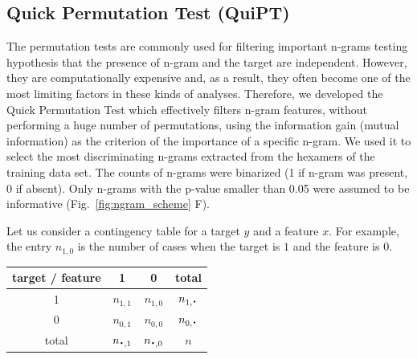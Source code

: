\documentclass[fleqn,10pt,twoside]{gcb15submission}
\newcommand*{\bigcdot}{\raisebox{-0.25ex}{\scalebox{1.5}{$\cdot$}}}
\begin{document}
\subsection{Quick Permutation Test (QuiPT)}

  The permutation tests are commonly used for filtering important n-grams 
testing hypothesis that the presence of n-gram and the target are independent. 
However, they are computationally expensive and, as a result, they often become 
one of the most limiting factors in these kinds of analyses. Therefore, we 
developed the Quick Permutation Test which effectively filters n-gram features, 
without performing a huge number of permutations, using the information gain 
(mutual information) as the criterion of the importance of a specific n-gram. We 
used it to select the most discriminating n-grams extracted from the hexamers of 
the training data set. The counts of n-grams were binarized (1 if n-gram was 
present, 0 if absent). Only n-grams with the p-value smaller than 0.05 were 
assumed to be informative (Fig.~\ref{fig:ngram_scheme} F). 
%
%
%
%
%

Let us consider a contingency table for a target $y$ and 
a feature $x$. For example, the entry $n_{1,0}$ is the number of cases when the 
target is $1$ and the feature is $0$.

\begin{center}
\begin{tabular}{ | c || c | c | c | }
%
%
  \hline			
  target / feature & 1 & 0 & total\\ \hline
 1 & $n_{1,1}$ & $n_{1,0}$ & $n_{1,\bigcdot}$ \\
 0 & $n_{0,1}$ & $n_{0,0}$ & $n_{0,\bigcdot}$ \\ \hline
 total & $n_{\bigcdot,1}$ & $n_{\bigcdot,0}$ & $n$ \\
  \hline  
\end{tabular} 
\end{center}
\end{document}
